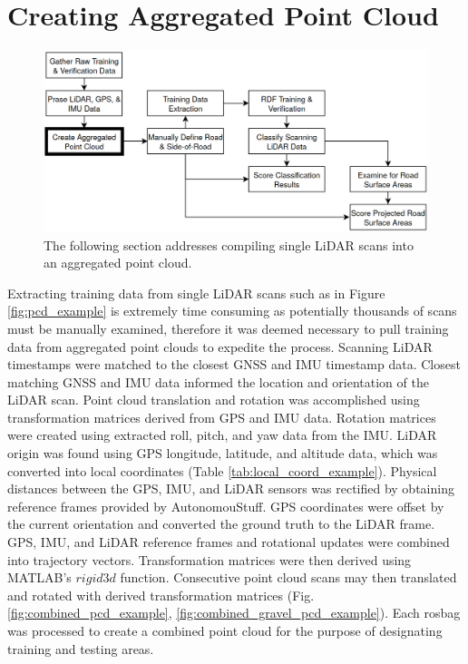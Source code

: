 \documentclass[numbered,pdftex]{ohio-etd}
\begin{document}
{{		
	} %
	
	\section{Creating Aggregated Point Cloud}\label{sec:create_aggregated_point_cloud}{
		
		\begin{figure}[H]
			\centering
			\includegraphics[width=0.9\linewidth]{Defense_Images/flowz_point_cloud}
			\caption[Aggregating Point Cloud Data Flowchart Context]{The following section addresses compiling single LiDAR scans into an aggregated point cloud.}
			\label{fig:flowz_point_cloud}
		\end{figure}
		
		{Extracting training data from single LiDAR scans such as in Figure \ref{fig:pcd_example} is extremely time consuming as potentially thousands of scans must be manually examined, therefore it was deemed necessary to pull training data from aggregated point clouds to expedite the process. Scanning LiDAR timestamps were matched to the closest GNSS and IMU timestamp data. Closest matching GNSS and IMU data informed the location and orientation of the LiDAR scan. Point cloud translation and rotation was accomplished using transformation matrices derived from GPS and IMU data. Rotation matrices were created using extracted roll, pitch, and yaw data from the IMU. LiDAR origin was found using GPS longitude, latitude, and altitude data, which was converted into local coordinates (Table \ref{tab:local_coord_example}). Physical distances between the GPS, IMU, and LiDAR sensors was rectified by obtaining reference frames provided by AutonomouStuff. GPS coordinates were offset by the current orientation and converted the ground truth to the LiDAR frame. GPS, IMU, and LiDAR reference frames and rotational updates were combined into trajectory vectors. Transformation matrices were then derived using MATLAB's $rigid3d$ function. Consecutive point cloud scans may then translated and rotated with derived transformation matrices (Fig. \ref{fig:combined_pcd_example}, \ref{fig:combined_gravel_pcd_example}). Each rosbag was processed to create a combined point cloud for the purpose of designating training and testing areas.}
		
}}
\end{document}
